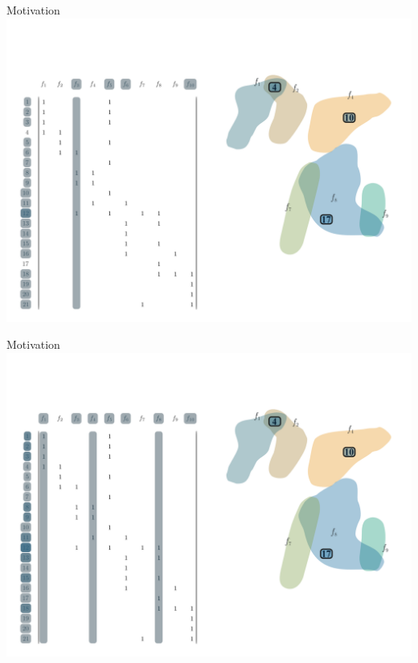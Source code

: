 \documentclass[10pt]{beamer}
\begin{document}
\begin{frame}[fragile]{Motivation}
    \vspace*{-3em}\hspace*{-2em}\includegraphics[width=1.15\textwidth]{Images/LSAExample/10}
\end{frame}

\begin{frame}[fragile]{Motivation}
    \vspace*{-3em}\hspace*{-2em}\includegraphics[width=1.15\textwidth]{Images/LSAExample/11}
\end{frame}
\end{document}
